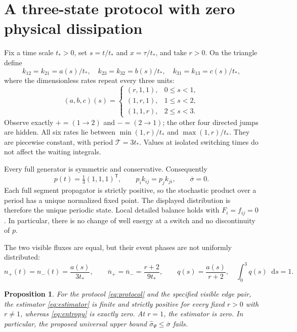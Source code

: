 \documentclass[11pt,a4paper]{article}
\newcommand{\dd}{\mathop{}\!\mathrm{d}}
\newcommand{\ts}{t_*}
\newcommand{\sigw}{\widehat{\sigma}_{\Psi}}
\newcommand{\sige}{\overline{\sigma}}
\newcommand{\T}{\mathcal{T}}
\newtheorem{proposition}{Proposition}
\begin{document}
\section{A three-state protocol with zero physical dissipation}
Fix a time scale $\ts>0$, set $s=t/\ts$ and $x=\tau/\ts$, and take $r>0$. On the triangle define
\begin{equation}
 k_{12}=k_{21}=a(s)/\ts,\quad
 k_{23}=k_{32}=b(s)/\ts,\quad
 k_{31}=k_{13}=c(s)/\ts,
 \label{eq:rates}
\end{equation}
where the dimensionless rates repeat every three units:
\begin{equation}
 (a,b,c)(s)=
 \begin{cases}
 (r,1,1),&0\le s<1,\\
 (1,r,1),&1\le s<2,\\
 (1,1,r),&2\le s<3.
 \end{cases}
 \label{eq:protocol}
\end{equation}
Observe exactly $+=(1\to2)$ and $-=(2\to1)$; the other four directed jumps are hidden. All six rates lie between $\min(1,r)/\ts$ and $\max(1,r)/\ts$. They are piecewise constant, with period $\T=3\ts$. Values at isolated switching times do not affect the waiting integrals.

Every full generator is symmetric and conservative. Consequently
\begin{equation}
 p(t)=\tfrac13(1,1,1)^{\mathsf T},\qquad
 p_i k_{ij}=p_j k_{ji},\qquad \sige=0.
 \label{eq:zero}
\end{equation}
Each full segment propagator is strictly positive, so the stochastic product over a period has a unique normalized fixed point. The displayed distribution is therefore the unique periodic state. Local detailed balance holds with $F_i=f_{ij}=0$. In particular, there is no change of well energy at a switch and no discontinuity of $p$.

The two visible fluxes are equal, but their event phases are not uniformly distributed:
\begin{equation}
 n_+(t)=n_-(t)=\frac{a(s)}{3\ts},\qquad
 \overline n_+=\overline n_-=\frac{r+2}{9\ts},\qquad
 q(s)=\frac{a(s)}{r+2},\quad \int_0^3q(s)\dd s=1.
 \label{eq:phaseweight}
\end{equation}

\begin{proposition}
For the protocol \eqref{eq:protocol} and the specified visible edge pair, the estimator \eqref{eq:estimator} is finite and strictly positive for every fixed $r>0$ with $r\ne1$, whereas \eqref{eq:entropy} is exactly zero. At $r=1$, the estimator is zero. In particular, the proposed universal upper bound $\sigw\le\sige$ fails.
\label{prop:main}
\end{proposition}
\end{document}

